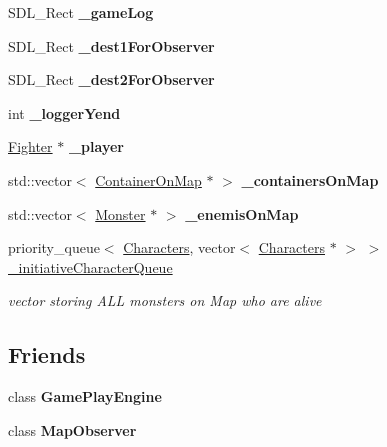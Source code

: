 \begin{DoxyCompactItemize}
S\+D\+L\+\_\+\+Rect {\bfseries \+\_\+game\+Log}
\item 
\hypertarget{class_pre_built_level_abd2b8176d4c4d1de51c58d3352492416}{}\label{class_pre_built_level_abd2b8176d4c4d1de51c58d3352492416} 
S\+D\+L\+\_\+\+Rect {\bfseries \+\_\+dest1\+For\+Observer}
\item 
\hypertarget{class_pre_built_level_a4ab513978b0fdbacc89d53a1be7b1d20}{}\label{class_pre_built_level_a4ab513978b0fdbacc89d53a1be7b1d20} 
S\+D\+L\+\_\+\+Rect {\bfseries \+\_\+dest2\+For\+Observer}
\item 
\hypertarget{class_pre_built_level_a52bf873681d57d9a08f432de8eafe544}{}\label{class_pre_built_level_a52bf873681d57d9a08f432de8eafe544} 
int {\bfseries \+\_\+logger\+Yend}
\item 
\hypertarget{class_pre_built_level_a2b17bc23df363f269fedf0aceafc9a02}{}\label{class_pre_built_level_a2b17bc23df363f269fedf0aceafc9a02} 
\hyperlink{class_fighter}{Fighter} $\ast$ {\bfseries \+\_\+player}
\item 
\hypertarget{class_pre_built_level_a757b4089f043d4cef9c24a19b24811fe}{}\label{class_pre_built_level_a757b4089f043d4cef9c24a19b24811fe} 
std\+::vector$<$ \hyperlink{struct_container_on_map}{Container\+On\+Map} $\ast$ $>$ {\bfseries \+\_\+containers\+On\+Map}
\item 
\hypertarget{class_pre_built_level_a41aee8e2e46946ee9e7b0405b7fa3983}{}\label{class_pre_built_level_a41aee8e2e46946ee9e7b0405b7fa3983} 
std\+::vector$<$ \hyperlink{class_monster}{Monster} $\ast$ $>$ {\bfseries \+\_\+enemis\+On\+Map}
\item 
\hypertarget{class_pre_built_level_a0a80761f7e8f6db2aa006cb21df4dd28}{}\label{class_pre_built_level_a0a80761f7e8f6db2aa006cb21df4dd28} 
priority\+\_\+queue$<$ \hyperlink{class_characters}{Characters}, vector$<$ \hyperlink{class_characters}{Characters} $\ast$ $>$ $>$ \hyperlink{class_pre_built_level_a0a80761f7e8f6db2aa006cb21df4dd28}{\+\_\+initiative\+Character\+Queue}
\begin{DoxyCompactList}\small\item\em vector storing A\+LL monsters on Map who are alive \end{DoxyCompactList}\end{DoxyCompactItemize}
\subsection*{Friends}
\begin{DoxyCompactItemize}
\item 
\hypertarget{class_pre_built_level_a111095a31d446732dbc0b23807c31ef4}{}\label{class_pre_built_level_a111095a31d446732dbc0b23807c31ef4} 
class {\bfseries Game\+Play\+Engine}
\item 
\hypertarget{class_pre_built_level_a8ff3038998158d7b28113f579f77909a}{}\label{class_pre_built_level_a8ff3038998158d7b28113f579f77909a} 
class {\bfseries Map\+Observer}
\end{DoxyCompactItemize}
